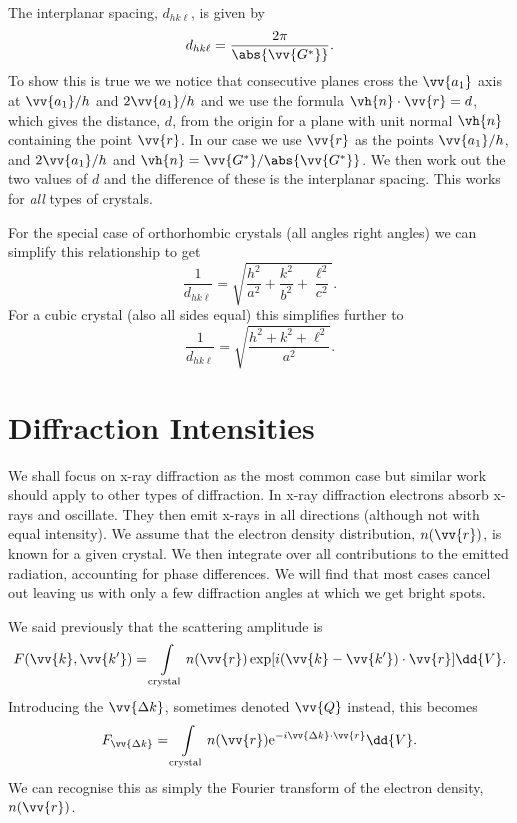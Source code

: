 \documentclass[fleqn]{NotesClass}
\newcommand*{\e}{\mathrm{e}}
\begin{document}
    The interplanar spacing, \(d_{hk\ell}\), is given by
    \begin{equation}
        d_{hk\ell} = \frac{2\pi}{\abs{\vv{G^*}}}.
    \end{equation}
    To show this is true we we notice that consecutive planes cross the \(\vv{a_1}\) axis at \(\vv{a_1}/h\) and \(2\vv{a_1}/h\) and we use the formula \(\vh{n}\cdot\vv{r} = d\), which gives the distance, \(d\), from the origin for a plane with unit normal \(\vh{n}\) containing the point \(\vv{r}\).
    In our case we use \(\vv{r}\) as the points \(\vv{a_1}/h\), and \(2\vv{a_1}/h\) and \(\vh{n} = \vv{G^*}/\abs{\vv{G^*}}\).
    We then work out the two values of \(d\) and the difference of these is the interplanar spacing.
    This works for \emph{all} types of crystals.
    
    For the special case of orthorhombic crystals (all angles right angles) we can simplify this relationship to get
    \begin{equation}
        \frac{1}{d_{hk\ell}} = \sqrt{\frac{h^2}{a^2} + \frac{k^2}{b^2} + \frac{\ell^2}{c^2}}.
    \end{equation}
    For a cubic crystal (also all sides equal) this simplifies further to
    \begin{equation}
        \frac{1}{d_{hk\ell}} = \sqrt{\frac{h^2 + k^2 + \ell^2}{a^2}}.
    \end{equation}
    
    \section{Diffraction Intensities}
    We shall focus on x-ray diffraction as the most common case but similar work should apply to other types of diffraction.
    In x-ray diffraction electrons absorb x-rays and oscillate.
    They then emit x-rays in all directions (although not with equal intensity).
    We assume that the electron density distribution, \(n(\vv{r})\), is known for a given crystal.
    We then integrate over all contributions to the emitted radiation, accounting for phase differences.
    We will find that most cases cancel out leaving us with only a few diffraction angles at which we get bright spots.
    
    We said previously that the scattering amplitude is
    \begin{equation}
        F(\vv{k}, \vv{k'}) = \int\limits_{\text{crystal}} n(\vv{r})\exp[i(\vv{k} - \vv{k'})\cdot\vv{r}]\dd{V}.
    \end{equation}
    Introducing the  \(\vv{\Delta k}\), sometimes denoted \(\vv{Q}\) instead, this becomes
    \begin{equation}
        F_{\vv{\Delta k}} = \int\limits_{\text{crystal}} n(\vv{r}) \e^{-i\vv{\Delta k}\cdot\vv{r}}\dd{V}.
    \end{equation}
    We can recognise this as simply the Fourier transform of the electron density, \(n(\vv{r})\).
    
\end{document}
